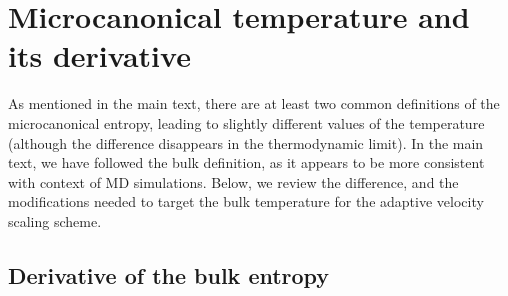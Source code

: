 \documentclass[reprint]{revtex4-1}
\begin{document}
\appendix






\section{\label{sec:microT}
Microcanonical temperature and its derivative}



As mentioned in the main text,
there are at least two common definitions of
the microcanonical entropy,
leading to slightly different values of the temperature
(although the difference disappears in the thermodynamic limit).
%
In the main text, we have followed the bulk
definition, as it appears to be more consistent
with context of MD simulations.
%
Below, we review the difference,
and the modifications needed to target the bulk temperature
for the adaptive velocity scaling scheme.



\subsection{Derivative of the bulk entropy}
\end{document}

